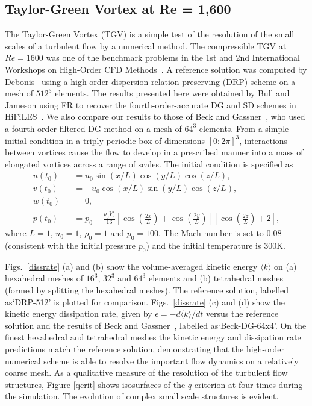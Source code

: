 \graphicspath{{figures_taylorgreen/}}%

\subsection{Taylor-Green Vortex at Re = 1,600}

The Taylor-Green Vortex (TGV) is a simple test of the resolution of the small scales of a turbulent flow by a numerical method.
The compressible TGV at $Re=1600$ was one of the benchmark problems in the 1st and 2nd International Workshops on High-Order CFD Methods~\cite{wang2013}.
A reference solution was computed by Debonis~\cite{debonis:13} using a high-order dispersion relation-preserving (DRP) scheme on a mesh of $512^3$ elements.
The results presented here were obtained by Bull and Jameson using FR to recover the fourth-order-accurate DG and SD schemes in HiFiLES~\cite{bull2014a,bull2014b}.
We also compare our results to those of Beck and Gassner~\cite{beck:12}, who used a fourth-order filtered DG method on a mesh of $64^3$ elements.
From a simple initial condition in a triply-periodic box of dimensions $[0:2\pi]^3$, interactions between vortices cause the flow to develop in a prescribed manner into a mass of elongated vortices across a range of scales.
The initial condition is specified as
%
\begin{eqnarray}\label{tgv}
u(t_0) &&= u_0 \sin (x/L) \cos (y/L) \cos (z/L), \\
v(t_0) &&= -u_0 \cos (x/L) \sin (y/L) \cos (z/L), \\
w(t_0) &&= 0, \\
p(t_0) &&= p_0 + \frac{\rho_0 V^2_0}{16} \left [ \cos \left (\frac{2x}{L} \right ) + \cos \left (\frac{2y}{L} \right ) \right ] \left [ \cos \left (\frac{2z}{L} \right ) + 2 \right ],
\end{eqnarray}
%
where $L = 1$, $u_0 = 1$, $\rho_0 = 1$ and $p_0 = 100$.
The Mach number is set to 0.08 (consistent with the initial pressure $p_0$) and the initial temperature is 300K.

Figs.~\ref{dissrate} (a) and (b) show the volume-averaged kinetic energy $\langle k \rangle$  on (a) hexahedral meshes of $16^3$, $32^3$ and $64^3$ elements and (b) tetrahedral meshes (formed by splitting the hexahedral meshes).
The reference solution, labelled as`DRP-512' is plotted for comparison.
Figs.~\ref{dissrate} (c) and (d) show the kinetic energy dissipation rate, given by $\epsilon = -d \langle k \rangle/dt$ versus the reference solution and the results of Beck and Gassner~\cite{beck:12}, labelled as`Beck-DG-64x4'.
On the finest hexahedral and tetrahedral meshes the kinetic energy and dissipation rate predictions match the reference solution, demonstrating that the high-order numerical scheme is able to resolve the important flow dynamics on a relatively coarse mesh.
As a qualitative measure of the resolution of the turbulent flow structures, Figure \ref{qcrit} shows isosurfaces of the $q$ criterion at four times during the simulation.
The evolution of complex small scale structures is evident.

